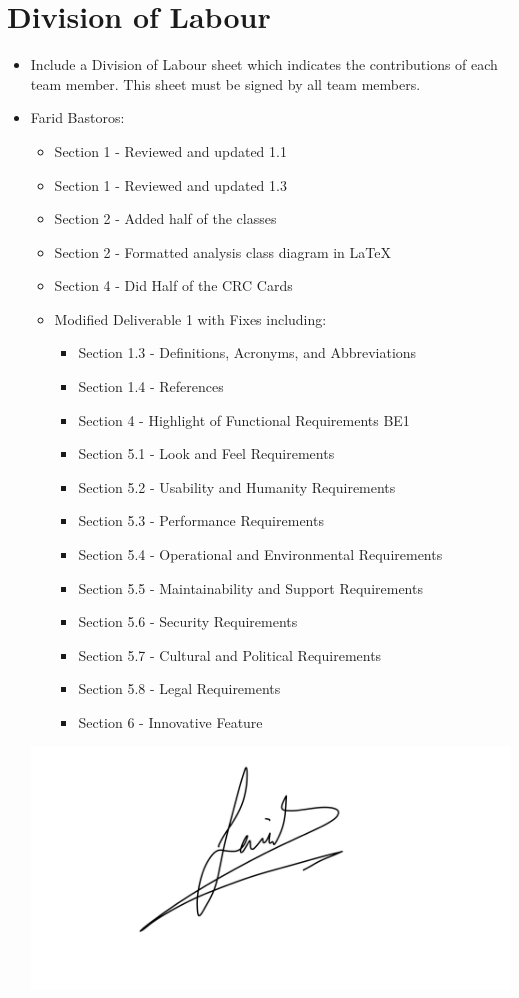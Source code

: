 \documentclass[]{article}
\begin{document}
\section{Division of Labour}
\label{sec:division_of_labour}
\begin{itemize}
	\item Include a Division of Labour sheet which indicates the contributions of each team member. This sheet must be signed by all team members.
	\item Farid Bastoros:
	\begin{itemize} 
		\item Section 1 - Reviewed and updated 1.1
		\item Section 1 - Reviewed and updated 1.3
		\item Section 2 - Added half of the classes
		\item Section 2 - Formatted analysis class diagram in LaTeX
		\item Section 4 - Did Half of the CRC Cards
		\item Modified Deliverable 1 with Fixes including: 
		\begin{itemize} 
			\item Section 1.3 - Definitions, Acronyms, and Abbreviations
			\item Section 1.4 - References
			\item Section 4 - Highlight of Functional Requirements BE1
			\item Section 5.1 - Look and Feel Requirements
			\item Section 5.2 - Usability and Humanity Requirements
			\item Section 5.3 - Performance Requirements
			\item Section 5.4 - Operational and Environmental Requirements
			\item Section 5.5 - Maintainability and Support Requirements
			\item Section 5.6 - Security Requirements
			\item Section 5.7 - Cultural and Political Requirements
			\item Section 5.8 - Legal Requirements
			\item Section 6 - Innovative Feature
		\end{itemize}
	\end{itemize}
	\includegraphics[scale=0.09]{Farid Bastoros - Signature.jpeg}\\ 

\end{itemize}
\end{document}
